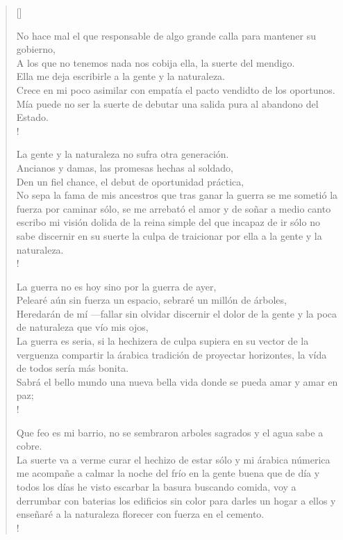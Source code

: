 \documentclass[11pt, a4paper]{article} %
\newcommand{\poemauthorright}[1]{\nopagebreak{\raggedleft\footnotesize\textsc{#1}\par}} %
\begin{document}

\settowidth{\versewidth}{Quiere mi tiempo libre la sutil, flexible dicha de buscarla, ------------------------------------------------------------------} %

\begin{verse}[\versewidth]
{\large

{\scriptsize

No hace mal el que responsable de algo grande calla para mantener su gobierno, \\
A los que no tenemos nada nos cobija ella, la suerte del mendigo. \\
Ella me deja escribirle a la gente y la naturaleza. \\
Crece en mi poco asimilar con empatía el pacto vendidto de los oportunos. \\
Mía puede no ser la suerte de debutar una salida pura al abandono del Estado. \\!

La gente y la naturaleza no sufra otra generación. \\
Ancianos y damas, las promesas hechas al soldado, \\
Den un fiel chance, el debut de oportunidad práctica, \\
No sepa la fama de mis ancestros que tras ganar la guerra se me sometió la fuerza por caminar sólo, se me arrebató el amor y de soñar 
a medio canto escribo mi visión dolida de la reina simple del que incapaz de ir sólo no sabe discernir en su suerte la culpa de traicionar 
por ella a la gente y la naturaleza. \\!

La guerra no es hoy sino por la guerra de ayer, \\
Pelearé aún sin fuerza un espacio, sebraré un millón de árboles, \\
Heredarán de mí ---fallar sin olvidar discernir el dolor de la gente y la poca de naturaleza que vío mis ojos, \\
La guerra es seria, si la hechizera de culpa supiera en su vector de la verguenza 
compartir la árabica tradición de proyectar horizontes, la vída de todos sería más bonita. \\
Sabrá el bello mundo una nueva bella vida donde se pueda amar y amar en paz; \\!

Que feo es mi barrio, no se sembraron arboles sagrados y el agua sabe a cobre. \\
La suerte va a verme curar el hechizo de estar sólo y mi árabica númerica me acompañe a calmar la noche del 
frío en la gente buena que de día y todos los días he visto escarbar la basura buscando comida, voy a 
derrumbar con baterias los edificios sin color para darles un hogar a ellos y enseñaré a la naturaleza florecer con fuerza en el cemento. \\!

}
}
\end{verse}


\poemauthorright{WAAJACU} %

\end{document}
